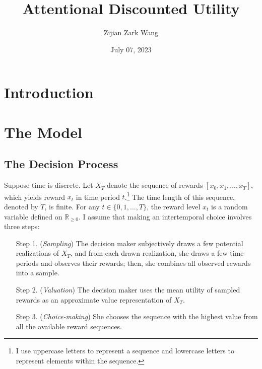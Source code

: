 \documentclass[
  12pt,
]{article}
\title{Attentional Discounted Utility}
\author{Zijian Zark Wang}
\date{July 07, 2023}
\begin{document}
\maketitle

\hypertarget{introduction}{%
\section{Introduction}\label{introduction}}

\hypertarget{the-model}{%
\section{The Model}\label{the-model}}

\hypertarget{the-decision-process}{%
\subsection{The Decision Process}\label{the-decision-process}}

Suppose time is discrete. Let \(X_T\) denote the sequence of rewards
\([x_0,x_1,...,x_T]\), which yields reward \(x_t\) in time period
\(t\).\footnote{I use uppercase letters to represent a sequence and
  lowercase letters to represent elements within the sequence.} The time
length of this sequence, denoted by \(T\), is finite. For any
\(t \in \{0,1,...,T\}\), the reward level \(x_t\) is a random variable
defined on \(\mathbb{R}_{\geq 0}\). I assume that making an
intertemporal choice involves three steps:

\begin{itemize}[leftmargin=2cm]
\item[Step 1.] (\textit{Sampling}) The decision maker subjectively draws a few potential realizations of $X_T$, and from each drawn realization, she draws a few time periods and observes their rewards; then, she combines all observed rewards into a sample.

\item[Step 2.] (\textit{Valuation}) The decision maker uses the mean utility of sampled rewards as an approximate value representation of $X_T$.

\item[Step 3.] (\textit{Choice-making}) She chooses the sequence with the highest value from all the available reward sequences.
\end{itemize}
\end{document}
